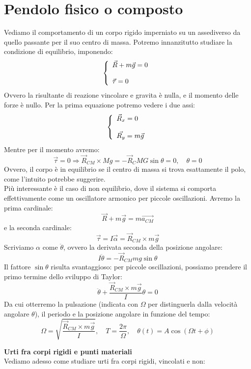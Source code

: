 \documentclass[a4paper,12pt]{article}
\begin{document}
\section{Pendolo fisico o composto}
Vediamo il comportamento di un corpo rigido imperniato su un assediverso da quello passante per il suo centro di massa. 
Potremo innanzitutto studiare la condizione di equilibrio, imponendo:
$$ 
\left\{\begin{array}{l}
    \vec{R} + m\vec{g} = 0 \cr \\
    \vec{\tau} = 0
\end{array}\right.
$$
Ovvero la risultante di reazione vincolare e gravita è nulla, e il momento delle forze è nullo.
Per la prima equazione potremo vedere i due assi:
$$ 
\left\{\begin{array}{l}
    \vec{R}_x = 0 \cr \\
    \vec{R_y} = m\vec{g}
\end{array}\right.
$$
Mentre per il momento avremo:
$$ \vec{\tau} = 0 \Rightarrow \vec{R}_{CM} \times Mg = -\vec{R}_{C} MG \sin{\theta} = 0, \quad \theta = 0$$
Ovvero, il corpo è in equilibrio se il centro di massa si trova esattamente il polo, come l'intuito potrebbe suggerire. \\
Più interessante è il caso di non equilibrio, dove il sistema si comporta effettivamente come un oscillatore armonico per piccole
oscillazioni. Avremo la prima cardinale:
$$ \vec{R} + m\vec{g} = m\vec{a_{CM}} $$
e la seconda cardinale:
$$ \vec{\tau} = I\vec{\alpha} = \vec{R}_{CM} \times m\vec{g} $$
Scriviamo $\alpha$ come $\ddot{\theta}$, ovvero la derivata seconda della posizione angolare:
$$ I\ddot{\theta} = -\vec{R}_{CM} mg\sin{\theta} $$
Il fattore $\sin{\theta}$ risulta svantaggioso: per piccole oscillazioni, possiamo prendere il primo termine dello sviluppo di Taylor:
$$ \ddot{\theta} + \frac{\vec{R}_{CM} \times m\vec{g}}{I}\theta = 0 $$
Da cui otterremo la pulsazione (indicata con $\Omega$ per distinguerla dalla velocità angolare $\theta$), il periodo e la posizione angolare in funzione del tempo:
$$ \Omega = \sqrt{\frac{\vec{R}_{CM} \times m\vec{g}}{I}}, \quad T = \frac{2\pi}{\Omega}, \quad \theta(t) = A\cos(\Omega t + \phi) $$
\par\smallskip
\textbf{Urti fra corpi rigidi e punti materiali} \\
Vediamo adesso come studiare urti fra corpi rigidi, vincolati e non:
\end{document}
